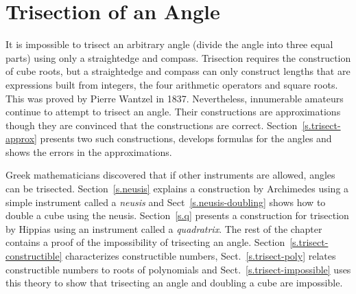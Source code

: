 
\chapter{Trisection of an Angle}\label{c.trisect}




It is impossible to trisect an arbitrary angle (divide the angle into three equal parts) using only a straightedge and compass. Trisection requires the construction of cube roots, but a straightedge and compass can only construct lengths that are expressions built from integers, the four arithmetic operators and square roots. This was proved by Pierre Wantzel in 1837. Nevertheless, innumerable amateurs continue to attempt to trisect an angle. Their constructions are approximations though they are convinced that the constructions are correct. Section~\ref{s.trisect-approx} presents two such constructions, develops formulas for the angles and shows the errors in the approximations.

Greek mathematicians discovered that if other instruments are allowed, angles can be trisected. Section~\ref{s.neusis} explains a construction by Archimedes using a simple instrument called a \emph{neusis} and Sect~\ref{s.neusis-doubling} shows how to double a cube using the neusis. Section~\ref{s.q} presents a construction for trisection by Hippias using an instrument called a \emph{quadratrix}. The rest of the chapter contains a proof of the impossibility of trisecting an angle. Section~\ref{s.trisect-constructible} characterizes constructible numbers, Sect.~\ref{s.trisect-poly} relates constructible numbers to roots of polynomials and Sect.~\ref{s.trisect-impossible} uses this theory to show that trisecting an angle and doubling a cube are impossible.

